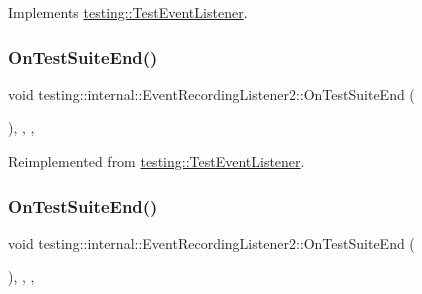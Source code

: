 Implements \mbox{\hyperlink{classtesting_1_1_test_event_listener_ab4f6a0ca16ae75daf385b3b5914e1048}{testing\+::\+Test\+Event\+Listener}}.

\mbox{\label{classtesting_1_1internal_1_1_event_recording_listener2_aefd67a80de94cdd8e2e43c0fad812bd2}} 
\subsubsection{\texorpdfstring{OnTestSuiteEnd()}{OnTestSuiteEnd()}\hspace{0.1cm}{\footnotesize\ttfamily [1/2]}}
{\footnotesize\ttfamily void testing\+::internal\+::\+Event\+Recording\+Listener2\+::\+On\+Test\+Suite\+End (\begin{DoxyParamCaption}\item[{const \mbox{\hyperlink{classtesting_1_1_test_suite}{Test\+Suite}} \&}]{ }\end{DoxyParamCaption})\hspace{0.3cm}{\ttfamily [inline]}, {\ttfamily [override]}, {\ttfamily [protected]}, {\ttfamily [virtual]}}



Reimplemented from \mbox{\hyperlink{classtesting_1_1_test_event_listener_a8962caad5d2522c9160c794074a662ee}{testing\+::\+Test\+Event\+Listener}}.

\mbox{\label{classtesting_1_1internal_1_1_event_recording_listener2_aefd67a80de94cdd8e2e43c0fad812bd2}} 
\subsubsection{\texorpdfstring{OnTestSuiteEnd()}{OnTestSuiteEnd()}\hspace{0.1cm}{\footnotesize\ttfamily [2/2]}}
{\footnotesize\ttfamily void testing\+::internal\+::\+Event\+Recording\+Listener2\+::\+On\+Test\+Suite\+End (\begin{DoxyParamCaption}\item[{const \mbox{\hyperlink{classtesting_1_1_test_suite}{Test\+Suite}} \&}]{ }\end{DoxyParamCaption})\hspace{0.3cm}{\ttfamily [inline]}, {\ttfamily [override]}, {\ttfamily [protected]}, {\ttfamily [virtual]}}



